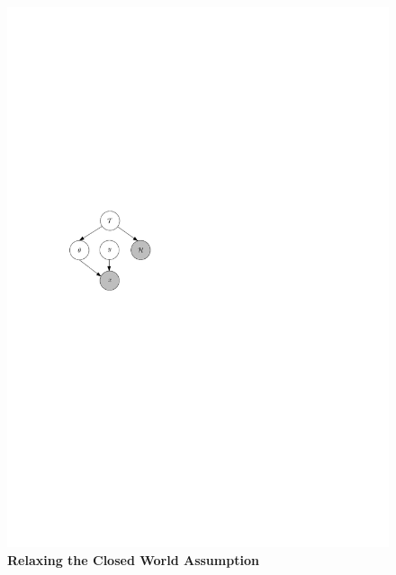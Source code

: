 \documentclass[12pt]{article}
\begin{document}
\begin{figure}
  \centering
  \includegraphics{generative.pdf}
  \caption{{\bf Relaxing the Closed World Assumption}}
  \label{generative}
\end{figure}
\end{document}
